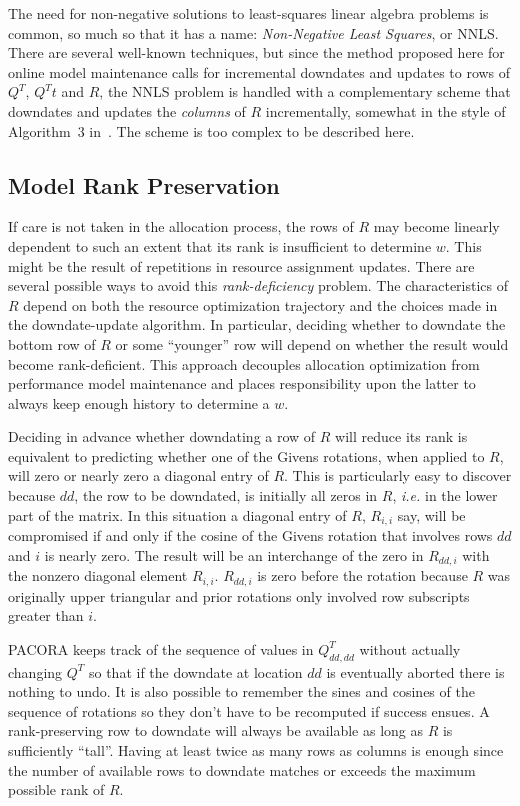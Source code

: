 The need for non-negative solutions to least-squares linear algebra problems is common,
so much so that it has a name: \emph{Non-Negative Least Squares}, or NNLS.
There are several well-known techniques\cite{ChPl},
but since the method proposed here for online model maintenance calls for
incremental downdates and updates to rows of $Q^T$, $Q^Tt$ and $R$,
the NNLS problem is handled with a complementary scheme that
downdates and updates the \emph{columns} of $R$ incrementally,
somewhat in the style of Algorithm~3 in~\cite{LuDu}.
The scheme is too complex to be described here.

\subsection*{Model Rank Preservation}

If care is not taken in the allocation process,
the rows of $R$ may become linearly dependent
to such an extent that its rank is insufficient to determine $w$.
This might be the result of repetitions in resource assignment updates.
There are several possible ways to avoid this \emph{rank-deficiency} problem.
The characteristics of $R$ depend on both the resource optimization trajectory and the
choices made in the downdate-update algorithm.
In particular, deciding whether to downdate the bottom row of $R$ or some ``younger'' row
will depend on whether the result would become rank-deficient.
This approach decouples allocation optimization from performance model maintenance
and places responsibility upon the latter to always keep enough history to determine a $w$.

Deciding in advance whether downdating a row of $R$ will reduce its rank
is equivalent to predicting whether one of the Givens rotations, when applied to $R$,
will zero or nearly zero a diagonal entry of $R$.
This is particularly easy to discover because $dd$, the row to be downdated, is initially all zeros in $R$,
\emph{i.e.} in the lower part of the matrix.
In this situation a diagonal entry of $R$, $R_{i,i}$ say, will be compromised if and only if the
cosine of the Givens rotation that involves rows $dd$ and $i$ is nearly zero.
The result will be an interchange of the zero in $R_{dd,i}$ with the nonzero diagonal element $R_{i,i}$.
$R_{dd,i}$ is zero before the rotation because
$R$ was originally upper triangular and prior rotations only involved row subscripts greater than $i$.

PACORA keeps track of the sequence of values in $Q^T_{dd,dd}$ without actually changing $Q^T$
so that if the downdate at location $dd$ is eventually aborted there is nothing to undo.
It is also possible to remember the sines and cosines of the sequence of rotations
so they don't have to be recomputed if success ensues.
A rank-preserving row to downdate will always be available as long as $R$ is sufficiently ``tall''.
Having at least twice as many rows as columns is enough since the number of available rows to downdate
matches or exceeds the maximum possible rank of $R$.

